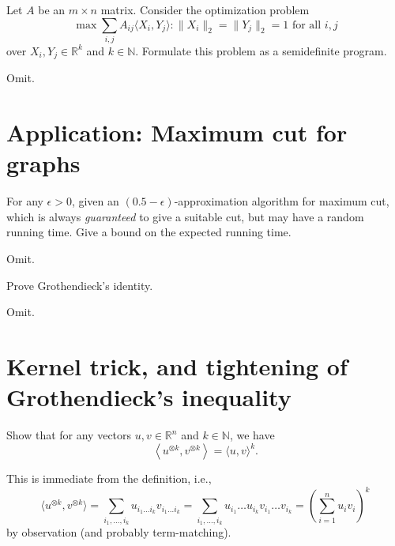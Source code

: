 \begin{problem*}[Exercise 3.5.7]\label{ex3.5.7}
	Let \(A\) be an \(m \times n\) matrix. Consider the optimization problem
	\[
		\max \sum_{i, j} A_{ij} \langle X_i, Y_j \rangle \colon \lVert X_i \rVert _2 = \lVert Y_j \rVert _2 = 1 \text{ for all } i, j
	\]
	over \(X_i, Y_j \in \mathbb{R} ^k\) and \(k \in \mathbb{N} \). Formulate this problem as a semidefinite program.
\end{problem*}
\begin{answer}
	Omit.
\end{answer}

\section{Application: Maximum cut for graphs}
\begin{problem*}[Exercise 3.6.4]\label{ex:3.6.4}
	For any \(\epsilon > 0\), given an \((0.5 - \epsilon )\)-approximation algorithm for maximum cut, which is always \emph{guaranteed} to give a suitable cut, but may have a random running time. Give a bound on the expected running time.
\end{problem*}
\begin{answer}
	Omit.
\end{answer}

\begin{problem*}[Exercise 3.6.7]\label{ex3.6.7}
	Prove Grothendieck's identity.
\end{problem*}
\begin{answer}
	Omit.
\end{answer}

\section{Kernel trick, and tightening of Grothendieck's inequality}
\begin{problem*}[Exercise 3.7.4]\label{ex3.7.4}
	Show that for any vectors \(u, v \in \mathbb{R} ^n\) and \(k \in \mathbb{N} \), we have
	\[
		\left\langle u^{\otimes k}, v^{\otimes k} \right\rangle
		= \langle u, v \rangle ^k.
	\]
\end{problem*}
\begin{answer}
	This is immediate from the definition, i.e.,
	\[
		\langle u ^{\otimes k}, v^{\otimes k}\rangle
		= \sum_{i_1, \dots , i_k} u_{i_1 \dots i_k} v_{i_1 \dots i_k}
		= \sum_{i_1, \dots , i_k} u_{i_1} \dots u_{i_k} v_{i_1} \dots v_{i_k}
		= \left( \sum_{i=1}^{n} u_i v_i \right)  ^k
	\]
	by observation (and probably term-matching).
\end{answer}

